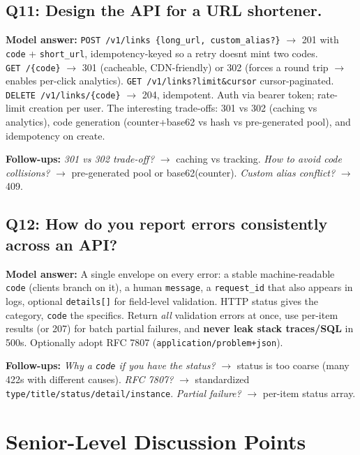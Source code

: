 \documentclass[11pt]{article}
\begin{document}
\subsection{Q11: Design the API for a URL shortener.}\label{q11-design-the-api-for-a-url-shortener}

\textbf{Model answer:} \texttt{POST\ /v1/links\ \{long\_url,\ custom\_alias?\}} \(\rightarrow\) 201 with \texttt{code} + \texttt{short\_url}, idempotency-keyed so a retry doesn\textquotesingle t mint two codes. \texttt{GET\ /\{code\}} \(\rightarrow\) 301 (cacheable, CDN-friendly) or 302 (forces a round trip \(\rightarrow\) enables per-click analytics). \texttt{GET\ /v1/links?limit\&cursor} cursor-paginated. \texttt{DELETE\ /v1/links/\{code\}} \(\rightarrow\) 204, idempotent. Auth via bearer token; rate-limit creation per user. The interesting trade-offs: 301 vs 302 (caching vs analytics), code generation (counter+base62 vs hash vs pre-generated pool), and idempotency on create.

\textbf{Follow-ups:} \emph{301 vs 302 trade-off?} \(\rightarrow\) caching vs tracking. \emph{How to avoid code collisions?} \(\rightarrow\) pre-generated pool or base62(counter). \emph{Custom alias conflict?} \(\rightarrow\) 409.

\subsection{Q12: How do you report errors consistently across an API?}\label{q12-how-do-you-report-errors-consistently-across-an-api}

\textbf{Model answer:} A single envelope on every error: a stable machine-readable \texttt{code} (clients branch on it), a human \texttt{message}, a \texttt{request\_id} that also appears in logs, optional \texttt{details{[}{]}} for field-level validation. HTTP status gives the category, \texttt{code} the specifics. Return \emph{all} validation errors at once, use per-item results (or 207) for batch partial failures, and \textbf{never leak stack traces/SQL} in 500s. Optionally adopt RFC 7807 (\texttt{application/problem+json}).

\textbf{Follow-ups:} \emph{Why a \texttt{code} if you have the status?} \(\rightarrow\) status is too coarse (many 422s with different causes). \emph{RFC 7807?} \(\rightarrow\) standardized \texttt{type/title/status/detail/instance}. \emph{Partial failure?} \(\rightarrow\) per-item status array.

\section{Senior-Level Discussion Points}\label{senior-level-discussion-points}
\end{document}
